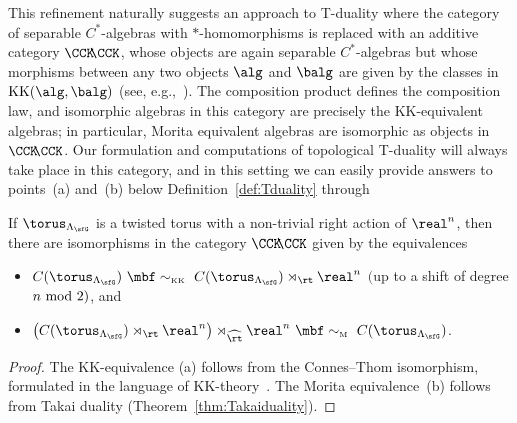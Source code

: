 This refinement naturally
suggests an approach to T-duality where the category of separable
$C^*$-algebras with $*$-homomorphisms is replaced with an additive
category ${\CCK\hspace{-1mm}\CCK}$, whose objects are again separable $C^*$-algebras
but whose morphisms between any two objects $\alg$ and $\balg$ are
given by the classes in ${\rm KK}(\alg,\balg)$ (see,
e.g.,~\cite{Brodzki2007}). The composition product defines the
composition law, and isomorphic algebras
in this category are precisely the KK-equivalent
algebras; in particular, Morita equivalent algebras are isomorphic
as objects in ${\CCK\hspace{-1mm}\CCK}$. Our formulation and computations of topological
T-duality will always take place in this category, and in this
setting we can easily provide answers to points~(a) and~(b) below Definition~\ref{def:Tduality}
through
\begin{Theorem}\label{thm:equivalences}
If $\torus_{\Lambda_\sfG}$ is a twisted torus with a
non-trivial right action
of $\real^n$, then there are
isomorphisms in the category ${\CCK\hspace{-1mm}\CCK}$ given by the equivalences
\begin{itemize}\itemsep=0pt
\item[{\rm (a)}]  $C(\torus_{\Lambda_\sfG}) \
 \mbf\sim_{\text{\tiny{KK}}} \
 C(\torus_{\Lambda_\sfG})\rtimes_\rt\real^n  $ $($up to a shift of degree
 $n \ {\rm mod}~2)$, and
\item[{\rm (b)}]  $\big(C(\torus_{\Lambda_\sfG})\rtimes_\rt
 \real^n\big)\rtimes_{\widehat\rt} \real^n \ \mbf\sim_{\text{\tiny
 M}} \ C(\torus_{\Lambda_\sfG})$.
\end{itemize}
\end{Theorem}
\begin{proof}
The KK-equivalence (a) follows from the Connes--Thom isomorphism,
formulated in the language of KK-theory~\cite{Fack1981}. The Morita
equivalence~(b) follows from Takai duality
(Theorem~\ref{thm:Takaiduality}).
\end{proof}
